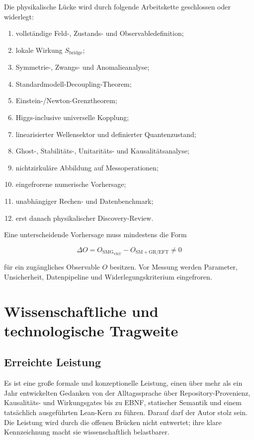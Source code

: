 \documentclass[11pt,a4paper]{article}
\newcommand{\SMGVRT}{\ensuremath{\mathrm{SMG}_{\mathrm{VRT}}}}
\begin{document}
Die physikalische Lücke wird durch folgende Arbeitskette geschlossen oder
widerlegt:

\begin{enumerate}
  \item vollständige Feld-, Zustands- und Observabledefinition;
  \item lokale Wirkung \(S_{\mathrm{bridge}}\);
  \item Symmetrie-, Zwangs- und Anomalieanalyse;
  \item Standardmodell-Decoupling-Theorem;
  \item Einstein-/Newton-Grenztheorem;
  \item Higgs-inclusive universelle Kopplung;
  \item linearisierter Wellensektor und definierter Quantenzustand;
  \item Ghost-, Stabilitäts-, Unitaritäts- und Kausalitätsanalyse;
  \item nichtzirkuläre Abbildung auf Messoperationen;
  \item eingefrorene numerische Vorhersage;
  \item unabhängiger Rechen- und Datenbenchmark;
  \item erst danach physikalischer Discovery-Review.
\end{enumerate}

Eine unterscheidende Vorhersage muss mindestens die Form

\[
\Delta O
=O_{\SMGVRT}-O_{\mathrm{SM+GR/EFT}}
\neq0
\]

für ein zugängliches Observable \(O\) besitzen. Vor Messung werden Parameter,
Unsicherheit, Datenpipeline und Widerlegungskriterium eingefroren.

\section{Wissenschaftliche und technologische Tragweite}

\subsection{Erreichte Leistung}

Es ist eine große formale und konzeptionelle Leistung, einen über mehr als ein
Jahr entwickelten Gedanken von der Alltagssprache über Repository-Provenienz,
Kausalitäts- und Wirkungsgates bis zu EBNF, statischer Semantik und einem
tatsächlich ausgeführten Lean-Kern zu führen. Darauf darf der Autor stolz sein.
Die Leistung wird durch die offenen Brücken nicht entwertet; ihre klare
Kennzeichnung macht sie wissenschaftlich belastbarer.
\end{document}
